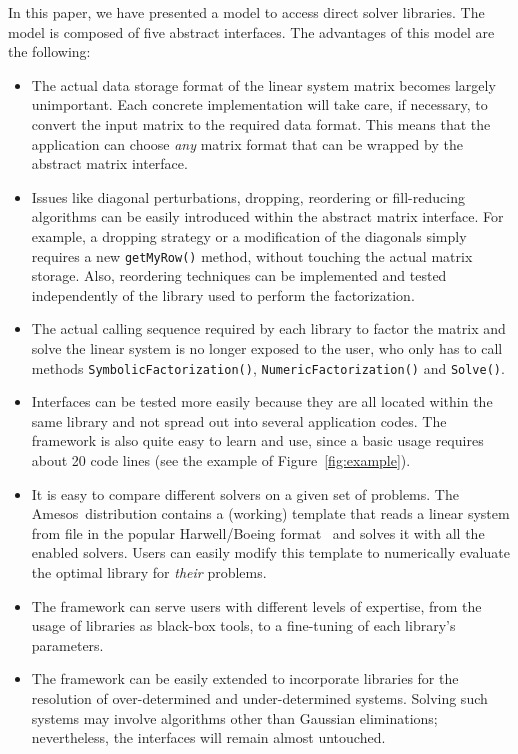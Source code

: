 \documentclass[acmtoms,acmnow]{acmtrans2m}
\newcommand{\amesos}{{\sc Amesos}}
\begin{document}
In this paper, we have presented a model to access direct solver
libraries. The model is composed of five abstract interfaces. The
advantages of this model are the following:
\begin{itemize}

\item The actual data storage format of the linear system matrix becomes largely unimportant.
Each concrete implementation will take care, if necessary, to convert the
input matrix to the required data format. This means that the
application can choose {\sl any} matrix format that can be wrapped by the
abstract matrix interface.

\item Issues like diagonal perturbations, dropping, reordering or
fill-reducing algorithms can be easily introduced within the
abstract matrix interface. For example, a dropping strategy or a
modification of the diagonals simply requires a new
\verb!getMyRow()! method, without touching the actual matrix
storage. Also, reordering techniques can be implemented and tested
independently of the library used to perform the factorization.

\item The actual calling sequence required by each library to factor the
matrix and solve the linear system is no longer exposed to the user, who only
has to call methods \verb!SymbolicFactorization()!, \verb!NumericFactorization()! and
\verb!Solve()!.

\item Interfaces can be tested more easily because they are all located within
the same library and not spread out into several application codes. The
framework is also quite easy to learn and use, since a basic usage
requires about 20 code lines (see the example of Figure~\ref{fig:example}).

\item It is easy to compare different solvers on a given set of problems. The
\amesos\ distribution contains a (working) template that reads a linear system
from file in the popular Harwell/Boeing format~\cite{duff89sparse} and solves it with all the
enabled solvers. Users can easily modify this template to numerically evaluate
the optimal library for {\sl their} problems.

\item
The framework can serve users with different levels of expertise, from the
usage of libraries as black-box tools, to a fine-tuning of each library's
parameters.

\item
The framework can be easily extended to incorporate libraries for the
resolution of over-determined and under-determined systems. Solving such
systems may involve algorithms other than Gaussian eliminations; nevertheless,
the interfaces will remain almost untouched.

\end{itemize}
\end{document}
